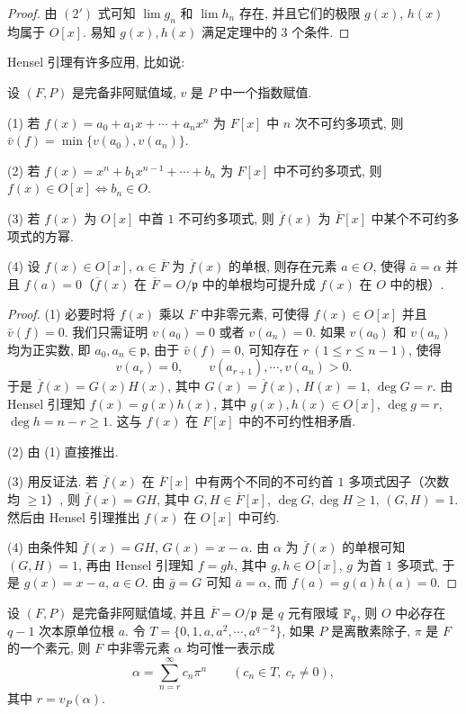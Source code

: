 \begin{proof}
由 $(2')$ 式可知 $\lim g_n$ 和 $\lim h_n$ 存在, 并且它们的极限 $g(x)$, $h(x)$ 均属于 $O[x]$. 易知 $g(x),h(x)$ 满足定理中的 $3$ 个条件.
\end{proof}

Hensel 引理有许多应用, 比如说:

\begin{theorem}\label{thm:8.7}
设 $(F,P)$ 是完备非阿赋值域, $v$ 是 $P$ 中一个指数赋值.

(1) 若 $f(x)=a_0+a_1x+\cdots+a_nx^n$ 为 $F[x]$ 中 $n$ 次不可约多项式, 则 $\bar{v}(f)=\min\{v(a_0),v(a_n)\}$.

(2) 若 $f(x)=x^n+b_1x^{n-1}+\cdots+b_n$ 为 $F[x]$ 中不可约多项式, 则 $f(x)\in O[x]\Leftrightarrow b_n\in O$.

(3) 若 $f(x)$ 为 $O[x]$ 中首 $1$ 不可约多项式, 则 $\overline{f}(x)$ 为 $\overline{F}[x]$ 中某个不可约多项式的方幂.

(4) 设 $f(x)\in O[x]$, $\alpha\in\overline{F}$ 为 $\overline{f}(x)$ 的单根, 则存在元素 $a\in O$, 使得 $\bar{a}=\alpha$ 并且 $f(a)=0$（$\overline{f}(x)$ 在 $\overline{F}=O/\mathfrak{p}$ 中的单根均可提升成 $f(x)$ 在 $O$ 中的根）.
\end{theorem}

\begin{proof}
(1) 必要时将 $f(x)$ 乘以 $F$ 中非零元素, 可使得 $f(x)\in O[x]$ 并且 $\bar{v}(f)=0$. 我们只需证明 $v(a_0)=0$ 或者 $v(a_n)=0$. 如果 $v(a_0)$ 和 $v(a_n)$ 均为正实数, 即 $a_0,a_n\in\mathfrak{p}$, 由于 $\bar{v}(f)=0$, 可知存在 $r\ (1\leqslant r\leqslant n-1)$, 使得
\[
  v(a_r)=0,\qquad v(a_{r+1}),\cdots,v(a_n)>0.
\]
于是 $\overline{f}(x)=G(x)H(x)$, 其中 $G(x)=\overline{f}(x)$, $H(x)=1$, $\deg G=r$. 由 Hensel 引理知 $f(x)=g(x)h(x)$, 其中 $g(x),h(x)\in O[x]$, $\deg g=r$, $\deg h=n-r\geqslant 1$. 这与 $f(x)$ 在 $F[x]$ 中的不可约性相矛盾.

(2) 由 (1) 直接推出.

(3) 用反证法. 若 $\overline{f}(x)$ 在 $\overline{F}[x]$ 中有两个不同的不可约首 $1$ 多项式因子（次数均 $\geqslant 1$）, 则 $\overline{f}(x)=GH$, 其中 $G,H\in\overline{F}[x]$, $\deg G,\deg H\geqslant 1$, $(G,H)=1$. 然后由 Hensel 引理推出 $f(x)$ 在 $O[x]$ 中可约.

(4) 由条件知 $\overline{f}(x)=GH$, $G(x)=x-\alpha$. 由 $\alpha$ 为 $\overline{f}(x)$ 的单根可知 $(G,H)=1$, 再由 Hensel 引理知 $f=gh$, 其中 $g,h\in O[x]$, $g$ 为首 $1$ 多项式, 于是 $g(x)=x-a$, $a\in O$. 由 $\bar{g}=G$ 可知 $\bar{a}=\alpha$, 而 $f(a)=g(a)h(a)=0$.
\end{proof}

\begin{theorem}\label{thm:8.8}
设 $(F,P)$ 是完备非阿赋值域, 并且 $\overline{F}=O/\mathfrak{p}$ 是 $q$ 元有限域 $\mathbb{F}_q$, 则 $O$ 中必存在 $q-1$ 次本原单位根 $a$. 令 $T=\{0,1,a,a^2,\cdots,a^{q-2}\}$, 如果 $P$ 是离散素除子, $\pi$ 是 $F$ 的一个素元, 则 $F$ 中非零元素 $\alpha$ 均可惟一表示成
\[
  \alpha=\sum_{n=r}^{\infty}c_n\pi^n\qquad(c_n\in T,\ c_r\neq 0),
\]
其中 $r=v_P(\alpha)$.
\end{theorem}

